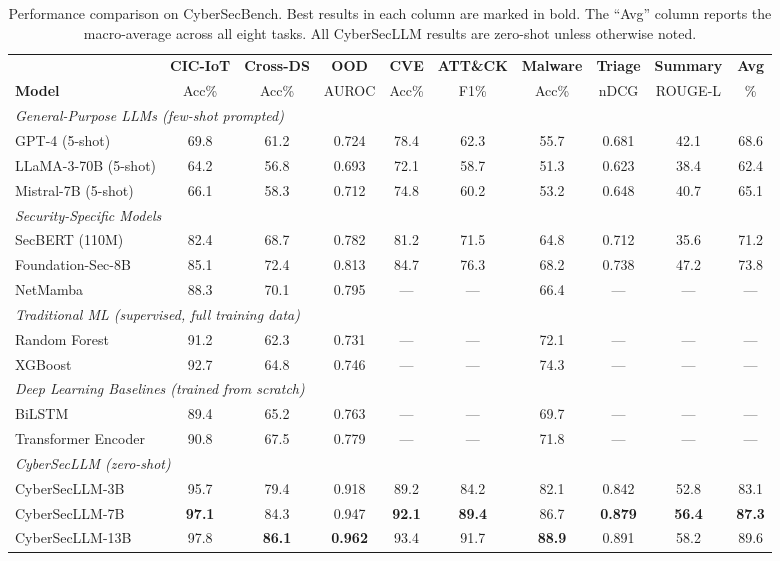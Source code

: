 \documentclass[journal]{IEEEtran}
\newcommand{\modelname}{CyberSecLLM}
\newcommand{\benchname}{CyberSecBench}
\begin{document}
\begin{table}[!t]
\centering
\caption{Performance comparison on \benchname{}. Best results in each column are marked in bold. The ``Avg'' column reports the macro-average across all eight tasks. All \modelname{} results are zero-shot unless otherwise noted.}
\label{tab:main_results}
\renewcommand{\arraystretch}{1.15}
\small
\begin{tabular}{l c c c c c c c c c}
\toprule
 & \textbf{CIC-IoT} & \textbf{Cross-DS} & \textbf{OOD} & \textbf{CVE} & \textbf{ATT\&CK} & \textbf{Malware} & \textbf{Triage} & \textbf{Summary} & \textbf{Avg} \\
\textbf{Model} & Acc\% & Acc\% & AUROC & Acc\% & F1\% & Acc\% & nDCG & ROUGE-L & \% \\
\midrule
\multicolumn{10}{l}{\textit{General-Purpose LLMs (few-shot prompted)}} \\
GPT-4 (5-shot)          & 69.8 & 61.2 & 0.724 & 78.4 & 62.3 & 55.7 & 0.681 & 42.1 & 68.6 \\
LLaMA-3-70B (5-shot)    & 64.2 & 56.8 & 0.693 & 72.1 & 58.7 & 51.3 & 0.623 & 38.4 & 62.4 \\
Mistral-7B (5-shot)     & 66.1 & 58.3 & 0.712 & 74.8 & 60.2 & 53.2 & 0.648 & 40.7 & 65.1 \\
\midrule
\multicolumn{10}{l}{\textit{Security-Specific Models}} \\
SecBERT (110M)          & 82.4 & 68.7 & 0.782 & 81.2 & 71.5 & 64.8 & 0.712 & 35.6 & 71.2 \\
Foundation-Sec-8B       & 85.1 & 72.4 & 0.813 & 84.7 & 76.3 & 68.2 & 0.738 & 47.2 & 73.8 \\
NetMamba                & 88.3 & 70.1 & 0.795 & --- & --- & 66.4 & --- & --- & --- \\
\midrule
\multicolumn{10}{l}{\textit{Traditional ML (supervised, full training data)}} \\
Random Forest           & 91.2 & 62.3 & 0.731 & --- & --- & 72.1 & --- & --- & --- \\
XGBoost                 & 92.7 & 64.8 & 0.746 & --- & --- & 74.3 & --- & --- & --- \\
\midrule
\multicolumn{10}{l}{\textit{Deep Learning Baselines (trained from scratch)}} \\
BiLSTM                  & 89.4 & 65.2 & 0.763 & --- & --- & 69.7 & --- & --- & --- \\
Transformer Encoder     & 90.8 & 67.5 & 0.779 & --- & --- & 71.8 & --- & --- & --- \\
\midrule
\multicolumn{10}{l}{\textit{CyberSecLLM (zero-shot)}} \\
\modelname{}-3B         & 95.7 & 79.4 & 0.918 & 89.2 & 84.2 & 82.1 & 0.842 & 52.8 & 83.1 \\
\modelname{}-7B         & \textbf{97.1} & 84.3 & 0.947 & \textbf{92.1} & \textbf{89.4} & 86.7 & \textbf{0.879} & \textbf{56.4} & \textbf{87.3} \\
\modelname{}-13B        & 97.8 & \textbf{86.1} & \textbf{0.962} & 93.4 & 91.7 & \textbf{88.9} & 0.891 & 58.2 & 89.6 \\
\bottomrule
\end{tabular}
\end{table}
\end{document}
